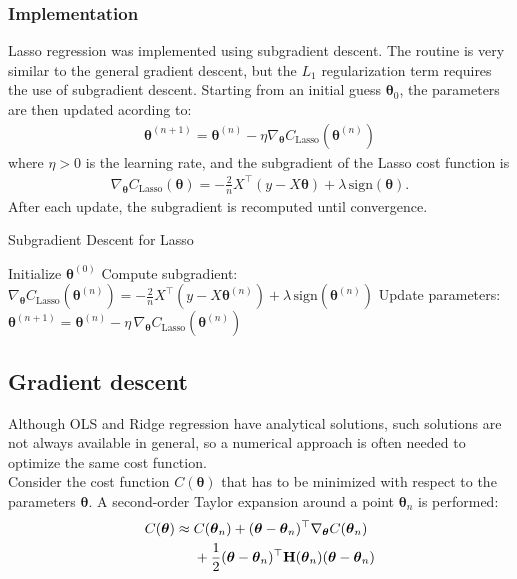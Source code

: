 \documentclass[
 reprint,            %
 amsmath,amssymb,
 aps,
]{revtex4-2}
\begin{document}
\subsubsection{Implementation}
Lasso regression was implemented using subgradient descent.
The routine is very similar to the general gradient descent, but the $L_1$ regularization term requires the use of subgradient descent.
Starting from an initial guess $\boldsymbol{\theta}_0$, the parameters are then updated acording to:
\begin{align}
    \boldsymbol{\theta}^{(n+1)} = \boldsymbol{\theta}^{(n)} - \eta \nabla_{\boldsymbol{\theta}} C_\text{Lasso}(\boldsymbol{\theta}^{(n)})
\end{align}
where $\eta > 0$ is the learning rate, and the subgradient of the Lasso cost function is
\begin{align}
    \nabla_{\boldsymbol{\theta}} C_\text{Lasso}(\boldsymbol{\theta}) = -\frac{2}{n} X^\top (y - X\boldsymbol{\theta}) + \lambda \, \mathrm{sign}(\boldsymbol{\theta}).
\end{align}
After each update, the subgradient is recomputed until convergence.
\begin{algorithm}[H]
\caption{Subgradient Descent for Lasso}
\begin{algorithmic}[1]
\State Initialize $\boldsymbol{\theta}^{(0)}$
    \State Compute subgradient: $\nabla_{\boldsymbol{\theta}} C_\text{Lasso}(\boldsymbol{\theta}^{(n)}) = -\frac{2}{n} X^\top (y - X\boldsymbol{\theta}^{(n)}) + \lambda \, \mathrm{sign}(\boldsymbol{\theta}^{(n)})$
    \State Update parameters:$\boldsymbol{\theta}^{(n+1)} = \boldsymbol{\theta}^{(n)} - \eta \, \nabla_{\boldsymbol{\theta}} C_\text{Lasso}(\boldsymbol{\theta}^{(n)})$
\EndFor
\end{algorithmic}
\end{algorithm}

\subsection{Gradient descent}

Although OLS and Ridge regression have analytical solutions, such solutions are not always available in general, so a numerical approach is often needed to optimize the same cost function.\\

Consider the cost function $C(\boldsymbol{\theta})$ that has to be minimized with respect to the parameters $\boldsymbol{\theta}$\cite{hjorthjensen_week36}.  
A second-order Taylor expansion around a point $\boldsymbol{\theta}_n$ is performed:
\begin{align}
C(\boldsymbol{\theta}) \approx{} & C(\boldsymbol{\theta}_n) 
+ (\boldsymbol{\theta}-\boldsymbol{\theta}_n)^\top \nabla_{\boldsymbol{\theta}} C(\boldsymbol{\theta}_n) \notag\\
& + \frac{1}{2} (\boldsymbol{\theta}-\boldsymbol{\theta}_n)^\top 
\mathbf{H}(\boldsymbol{\theta}_n) (\boldsymbol{\theta}-\boldsymbol{\theta}_n)
\end{align}
\end{document}
